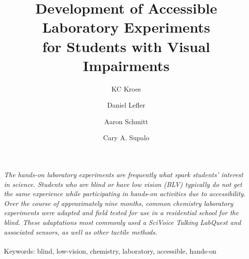 \documentclass[11.5pt]{sig-alternate} %
\makeatletter
\let\oldabstract\abstract
\let\oldendabstract\endabstract
\renewenvironment{abstract} %
{\renewenvironment{quotation}%
               {\list{}{\addtolength{\leftmargin}{1em} %
                        \listparindent 1.5em%
                        \itemindent    \listparindent%
                        \rightmargin   \leftmargin%
                        \parsep        \z@ \@plus\p@}%
                \item\relax}%
               {\endlist}%
\oldabstract}
{\oldendabstract}
\makeatother
\begin{document}
\title{Development of Accessible Laboratory Experiments \\for Students with Visual Impairments}

\author[1]{\large \color{blue}KC Kroes}
\author[1]{\large \color{blue}Daniel Lefler}
\author[1]{\large \color{blue}Aaron Schmitt}
\author[2]{\large \color{blue}Cary A. Supalo}


\toappear{}
\maketitle
\begin{@twocolumnfalse} 
\begin{abstract}
\item 
\textit{The hands-on laboratory experiments are frequently what spark students’ interest in science. Students who are blind or have low vision (BLV) typically do not get the same experience while participating in hands-on activities due to accessibility. Over the course of approximately nine months, common chemistry laboratory experiments were adapted and field tested for use in a residential school for the blind. These adaptations most commonly used a SciVoice Talking LabQuest and associated sensors, as well as other tactile methods.}
\\ \\
Keywords: blind, low-vision, chemistry, laboratory, accessible, hands-on
\end{abstract}
\end{@twocolumnfalse}

\end{document}
